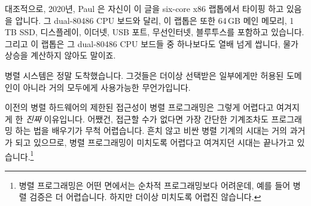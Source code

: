 {	\fi

	대조적으로, 2020년, Paul 은 자신이 이 글을 six-core x86 랩톱에서 타이핑
	하고 있음을 압니다.
	그 dual-80486 CPU 보드와 달리, 이 랩톱은 또한 64\,GB 메인 메모리, 1\,TB
	SSD, 디스플레이, 이더넷, USB 포트, 무선인터넷, 블루투스를 포함하고
	있습니다.
	그리고 이 랩톱은 그 dual-80486 CPU 보드들 중 하나보다도 열배 넘게
	쌉니다, 물가 상승을 계산하지 않아도 말이죠.

	병렬 시스템은 정말 도착했습니다.
	그것들은 더이상 선택받은 일부에게만 허용된 도메인이 아니라 거의
	모두에게 사용가능한 무언가입니다.

	이전의 병렬 하드웨어의 제한된 접근성이 병렬 프로그래밍은 그렇게
	어렵다고 여겨지게 한 \emph{진짜} 이유입니다.
	어쨌건, 접근할 수가 없다면 가장 간단한 기계조차도 프로그래밍 하는 법을
	배우기가 무척 어렵습니다.
	흔치 않고 비싼 병렬 기계의 시대는 거의 과거가 되고 있으므로, 병렬
	프로그래밍이 미치도록 어렵다고 여겨지던 시대는 끝나가고
	있습니다.\footnote{ 병렬 프로그래밍은 어떤 면에서는 순차적
		프로그래밍보다 어려운데, 예를 들어 병렬 검증은 더 어렵습니다.
		하지만 더이상 미치도록 어렵진 않습니다.}

}\QuickQuizEnd

